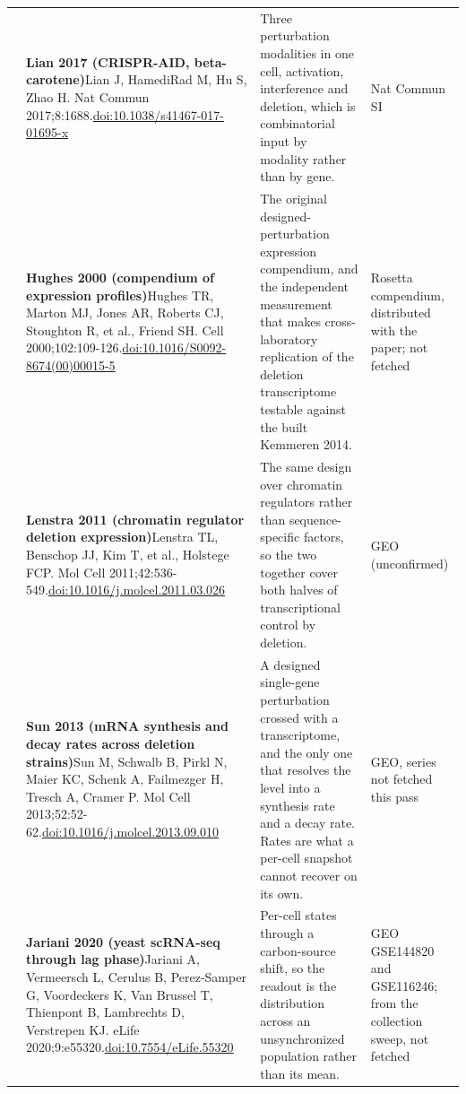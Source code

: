 \begin{landscape}
\begin{longtable}{@{}r@{\hspace{4pt}} L{86mm} L{92mm} L{62mm}@{}}
 & \textbf{Lian 2017 (CRISPR-AID, beta-carotene)}\newline Lian J, HamediRad M, Hu S, Zhao H. Nat Commun 2017;8:1688.\newline \href{https://doi.org/10.1038/s41467-017-01695-x}{doi:10.1038/\allowbreak s41467-017-01695-x} & Three perturbation modalities in one cell, activation, interference and deletion, which is combinatorial input by modality rather than by gene. & Nat Commun SI \\
 & \textbf{Hughes 2000 (compendium of expression profiles)}\newline Hughes TR, Marton MJ, Jones AR, Roberts CJ, Stoughton R, et al., Friend SH. Cell 2000;102:109-126.\newline \href{https://doi.org/10.1016/S0092-8674(00)00015-5}{doi:10.1016/\allowbreak S0092-8674(00)00015-5} & The original designed-perturbation expression compendium, and the independent measurement that makes cross-laboratory replication of the deletion transcriptome testable against the built Kemmeren 2014. & Rosetta compendium, distributed with the paper; not fetched \\
 & \textbf{Lenstra 2011 (chromatin regulator deletion expression)}\newline Lenstra TL, Benschop JJ, Kim T, et al., Holstege FCP. Mol Cell 2011;42:536-549.\newline \href{https://doi.org/10.1016/j.molcel.2011.03.026}{doi:10.1016/\allowbreak j.molcel.2011.03.026} & The same design over chromatin regulators rather than sequence-specific factors, so the two together cover both halves of transcriptional control by deletion. & GEO (unconfirmed) \\
 & \textbf{Sun 2013 (mRNA synthesis and decay rates across deletion strains)}\newline Sun M, Schwalb B, Pirkl N, Maier KC, Schenk A, Failmezger H, Tresch A, Cramer P. Mol Cell 2013;52:52-62.\newline \href{https://doi.org/10.1016/j.molcel.2013.09.010}{doi:10.1016/\allowbreak j.molcel.2013.09.010} & A designed single-gene perturbation crossed with a transcriptome, and the only one that resolves the level into a synthesis rate and a decay rate. Rates are what a per-cell snapshot cannot recover on its own. & GEO, series not fetched this pass \\
 & \textbf{Jariani 2020 (yeast scRNA-seq through lag phase)}\newline Jariani A, Vermeersch L, Cerulus B, Perez-Samper G, Voordeckers K, Van Brussel T, Thienpont B, Lambrechts D, Verstrepen KJ. eLife 2020;9:e55320.\newline \href{https://doi.org/10.7554/eLife.55320}{doi:10.7554/\allowbreak eLife.55320} & Per-cell states through a carbon-source shift, so the readout is the distribution across an unsynchronized population rather than its mean. & GEO GSE144820 and GSE116246; from the collection sweep, not fetched \\

\end{longtable}
\end{landscape}
